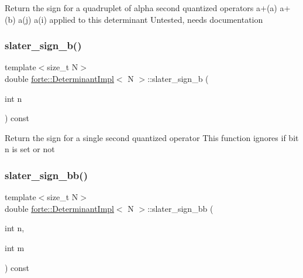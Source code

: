 Return the sign for a quadruplet of alpha second quantized operators a+(a) a+(b) a(j) a(i) applied to this determinant Untested, needs documentation \mbox{\label{classforte_1_1_determinant_impl_ad6b9f063782fe2abb85a742f0a223ec1}} 
\subsubsection{\texorpdfstring{slater\+\_\+sign\+\_\+b()}{slater\_sign\_b()}}
{\footnotesize\ttfamily template$<$size\+\_\+t N$>$ \\
double \mbox{\hyperlink{classforte_1_1_determinant_impl}{forte\+::\+Determinant\+Impl}}$<$ N $>$\+::slater\+\_\+sign\+\_\+b (\begin{DoxyParamCaption}\item[{int}]{n }\end{DoxyParamCaption}) const\hspace{0.3cm}{\ttfamily [inline]}}

Return the sign for a single second quantized operator This function ignores if bit n is set or not \mbox{\label{classforte_1_1_determinant_impl_afa8fce46c2de5e0d65878f49315aeb9f}} 
\subsubsection{\texorpdfstring{slater\+\_\+sign\+\_\+bb()}{slater\_sign\_bb()}}
{\footnotesize\ttfamily template$<$size\+\_\+t N$>$ \\
double \mbox{\hyperlink{classforte_1_1_determinant_impl}{forte\+::\+Determinant\+Impl}}$<$ N $>$\+::slater\+\_\+sign\+\_\+bb (\begin{DoxyParamCaption}\item[{int}]{n,  }\item[{int}]{m }\end{DoxyParamCaption}) const\hspace{0.3cm}{\ttfamily [inline]}}

